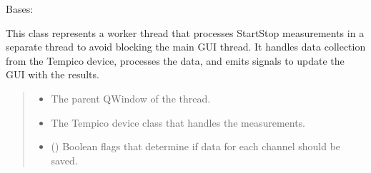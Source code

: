 \documentclass[letterpaper,10pt,english]{sphinxmanual}
\begin{document}
\begin{fulllineitems}
\label{\detokenize{StartStopHist:StartStopHist.WorkerThreadStartStopHistogram}}
\pysigstartsignatures
{}
\pysigstopsignatures
\sphinxAtStartPar
Bases: 

\sphinxAtStartPar
This class represents a worker thread that processes Start\sphinxhyphen{}Stop measurements in a separate thread to avoid blocking the main GUI thread. 
It handles data collection from the Tempico device, processes the data, and emits signals to update the GUI with the results.
\begin{quote}\begin{description}
\begin{itemize}
\item {} 
\sphinxAtStartPar
{} \textendash{} The parent QWindow of the thread.

\item {} 
\sphinxAtStartPar
{} \textendash{} The Tempico device class that handles the measurements.

\item {} 
\sphinxAtStartPar
{} (\sphinxstyleliteralemphasis{\sphinxupquote{, }}\sphinxstyleliteralemphasis{\sphinxupquote{, }}\sphinxstyleliteralemphasis{\sphinxupquote{,}}) \textendash{} Boolean flags that determine if data for each channel should be saved.

\end{itemize}

\end{description}\end{quote}


\end{fulllineitems}
\end{document}
